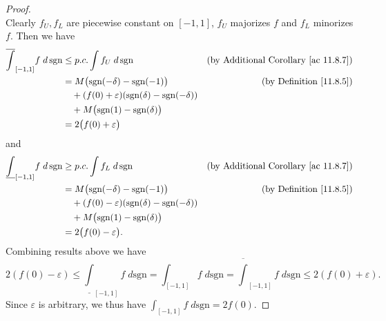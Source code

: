 \begin{proof}
\[    \]
    Clearly \(f_U, f_L\) are piecewise constant on \([-1, 1]\), \(f_U\) majorizes \(f\) and \(f_L\) minorizes \(f\).
    Then we have
    \begin{align*}
        \overline{\int}_{[-1, 1]} f \; d \, \text{sgn} & \leq p.c. \int f_U \; d \, \text{sgn}                                   & \text{(by Additional Corollary \ref{ac 11.8.7})} \\
                                                       & = M \big(\text{sgn}(-\delta) - \text{sgn}(-1)\big)                      & \text{(by Definition \ref{11.8.5})}              \\
                                                       & \quad + (f(0) + \varepsilon) (\text{sgn}(\delta) - \text{sgn}(-\delta))                                                    \\
                                                       & \quad + M \big(\text{sgn}(1) - \text{sgn}(\delta)\big)                                                                     \\
                                                       & = 2\big(f(0) + \varepsilon\big)
    \end{align*}
    and
    \begin{align*}
        \underline{\int}_{[-1, 1]} f \; d \, \text{sgn} & \geq p.c. \int f_L \; d \, \text{sgn}                                   & \text{(by Additional Corollary \ref{ac 11.8.7})} \\
                                                        & = M \big(\text{sgn}(-\delta) - \text{sgn}(-1)\big)                      & \text{(by Definition \ref{11.8.5})}              \\
                                                        & \quad + (f(0) - \varepsilon) (\text{sgn}(\delta) - \text{sgn}(-\delta))                                                    \\
                                                        & \quad + M \big(\text{sgn}(1) - \text{sgn}(\delta)\big)                                                                     \\
                                                        & = 2\big(f(0) - \varepsilon\big).
    \end{align*}
    Combining results above we have
    \[
        2(f(0) - \varepsilon) \leq \underline{\int}_{[-1, 1]} f \; d \text{sgn} = \int_{[-1, 1]} f \; d \text{sgn} = \overline{\int}_{[-1, 1]} f \; d \text{sgn} \leq 2(f(0) + \varepsilon).
    \]
    Since \(\varepsilon\) is arbitrary, we thus have \(\int_{[-1, 1]} f \; d \text{sgn} = 2f(0)\).
\end{proof}